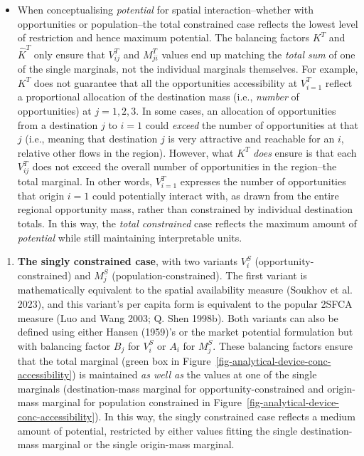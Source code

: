 \documentclass[
]{article}
\providecommand{\tightlist}{%
  \setlength{\itemsep}{0pt}\setlength{\parskip}{0pt}}\usepackage{longtable,booktabs,array}
\begin{document}
\begin{itemize}
\tightlist
\item
  When conceptualising \emph{potential} for spatial interaction--whether
  with opportunities or population--the total constrained case reflects
  the lowest level of restriction and hence maximum potential. The
  balancing factors \(K^T\) and \(\hat K^T\) only ensure that
  \(V_{ij}^T\) and \(M_{ji}^T\) values end up matching the \emph{total
  sum} of one of the single marginals, not the individual marginals
  themselves. For example, \(K^T\) does not guarantee that all the
  opportunities accessibility at \(V_{i=1}^T\) reflect a proportional
  allocation of the destination mass (i.e., \emph{number} of
  opportunities) at \(j=1, 2, 3\). In some cases, an allocation of
  opportunities from a destination \(j\) to \(i=1\) could \emph{exceed}
  the number of opportunities at that \(j\) (i.e., meaning that
  destination \(j\) is very attractive and reachable for an \(i\),
  relative other flows in the region). However, what \(K^T\) \emph{does}
  ensure is that each \(V_{ij}^T\) does not exceed the overall number of
  opportunities in the region--the total marginal. In other words,
  \(V_{i=1}^T\) expresses the number of opportunities that origin
  \(i=1\) could potentially interact with, as drawn from the entire
  regional opportunity mass, rather than constrained by individual
  destination totals. In this way, the \emph{total constrained} case
  reflects the maximum amount of \emph{potential} while still
  maintaining interpretable units.
\end{itemize}

\begin{enumerate}
\def\labelenumi{\arabic{enumi}.}
\setcounter{enumi}{2}
\tightlist
\item
  \textbf{The singly constrained case}, with two variants \(V_i^S\)
  (opportunity-constrained) and \(M_j^S\) (population-constrained). The
  first variant is mathematically equivalent to the spatial availability
  measure (Soukhov et al. 2023), and this variant's per capita form is
  equivalent to the popular 2SFCA measure (Luo and Wang 2003; Q. Shen
  1998b). Both variants can also be defined using either Hansen (1959)'s
  or the market potential formulation but with balancing factor \(B_j\)
  for \(V_i^S\) or \(A_i\) for \(M_j^S\). These balancing factors ensure
  that the total marginal (green box in
  Figure~\ref{fig-analytical-device-conc-accessibility}) is maintained
  \emph{as well as} the values at one of the single marginals
  (destination-mass marginal for opportunity-constrained and origin-mass
  marginal for population constrained in
  Figure~\ref{fig-analytical-device-conc-accessibility}). In this way,
  the singly constrained case reflects a medium amount of potential,
  restricted by either values fitting the single destination-mass
  marginal or the single origin-mass marginal.
\end{enumerate}
\end{document}

